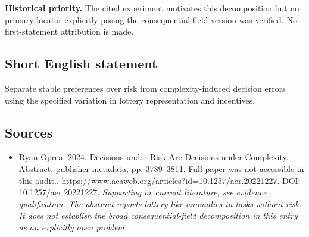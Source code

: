 \documentclass[11pt]{article}
\begin{document}
\par\textbf{Historical priority.} The cited experiment motivates this decomposition but no primary locator explicitly posing the consequential-field version was verified. No first-statement attribution is made.

\subsection{Short English statement}
Separate stable preferences over risk from complexity-induced decision errors using the specified variation in lottery representation and incentives.

\subsection{Sources}
\begin{itemize}\raggedright
\item[\textnormal{[S1]}]\hypertarget{source:30007582:1}{} Ryan Oprea. 2024. Decisions under Risk Are Decisions under Complexity. Abstract; publisher metadata, pp. 3789–3811. Full paper was not accessible in this audit..
\url{https://www.aeaweb.org/articles?id=10.1257/aer.20221227}.
DOI: 10.1257/aer.20221227.
{\small\textit{Supporting or current literature; see evidence qualification. The abstract reports lottery-like anomalies in tasks without risk. It does not establish the broad consequential-field decomposition in this entry as an explicitly open problem.}}
\end{itemize}
\end{document}
